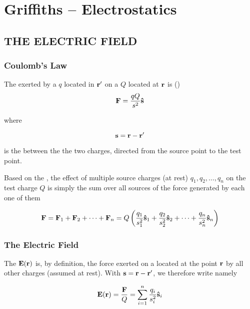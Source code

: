 \chapter{Griffiths -- Electrostatics}
\label{ch:Griffiths_01} 

\section{THE ELECTRIC FIELD}
\subsection{Coulomb's Law}
The  exerted by a  $q$ located  in $\vb{r}'$ on a  $Q$ located at $\vb{r}$  is ()
\begin{equation}
\label{eq:G01_coulomb}
\vb{F} = \frac{qQ}{s^2} \vu{s}
\end{equation}

where 

\begin{equation}
\label{eq:G01_separation}
\vb{s} = \vb{r} - \vb{r}'
\end{equation}

is the  between the the two charges, directed from the source point to the test point. 

Based on the , the effect of multiple source charges (at rest) $q_1, q_2, \ldots, q_n$ on the test charge $Q$ is simply the sum over all sources of the force generated by each one of them

\begin{equation}
\label{eq:G01_superposition}
\vb{F} =  \vb{F}_1 + \vb{F}_2 + \cdots + \vb{F}_n = Q \left( \frac{q_1}{s_1^2} \vu{s}_1 + \frac{q_2}{s_2^2} \vu{s}_2 + \cdots + \frac{q_n}{s_n^2} \vu{s}_n \right)
\end{equation}

\subsection{The Electric Field}
The  $\vb{E}(\vb{r})$ is, by definition, the force exerted on a  located at the point $\vb{r}$ by all other charges (assumed at rest). With $\vb{s} = \vb{r} - \vb{r}'$, we therefore write namely

\begin{equation}
\label{eq:G01_electrostatic_field}
\vb{E}(\vb{r}) = \frac{\vb{F}}{Q} =  \sum_{i=1}^n \frac{q_i}{s_i^2} \vu{s}_i
\end{equation}

